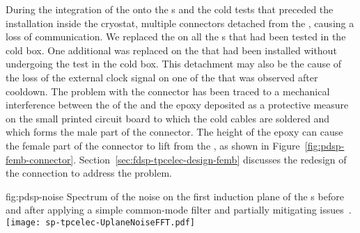 \begin{comment}During the integration of the \dwords{femb} onto the \dword{apa}s 
and the cold tests that preceded the \dword{apa}s installation
inside the \dword{pdsp} cryostat a problem occurred %
on the 
connection between the cold readout and control cables and the
\dwords{femb}. In multiple cases the connector %
detached from
the \dword{femb} causing a loss of communication. 
\end{comment}
During the integration of the  onto the s 
and the cold tests that preceded the  installation
inside the  cryostat,  multiple connectors  
detached from
the , causing a loss of communication.  
We replaced the  %
on all the s that had been tested in the cold box. %
One additional  was 
replaced on the  that had been installed without undergoing 
the test in the cold box. This %
detachment may also be the cause
of the loss of the external clock signal on one of the 
that was observed after cooldown. %
%
The problem 
with the connector has been traced to a mechanical interference between 
the  of the  and the epoxy deposited as a protective measure on the small printed circuit
board to which the cold cables are soldered and which forms the 
male part of the connector. The height of the epoxy can cause 
the female part of the connector to lift from the ,
as shown in 
Figure~\ref{fig:pdsp-femb-connector}. %
Section~\ref{sec:fdsp-tpcelec-design-femb} discusses the redesign of the connection to address the problem.


\begin{dunefigure}
{fig:pdsp-noise}
{Spectrum of the noise on the first induction plane of the  s before
 and after applying a simple common-mode filter and partially mitigating  issues~\cite{pend_PDSP_PerfPaper}.}
\texttt{[image: sp-tpcelec-UplaneNoiseFFT.pdf]}
\end{dunefigure}

